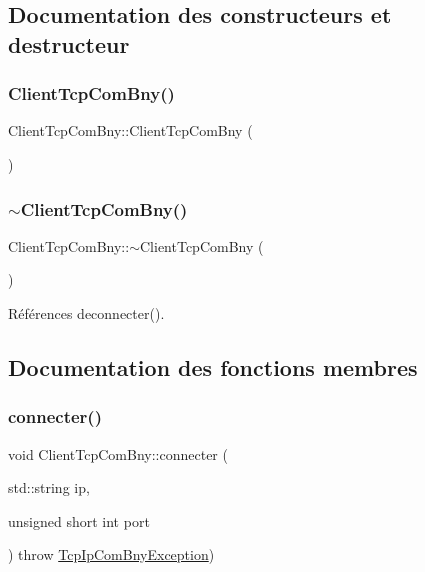 \subsection{Documentation des constructeurs et destructeur}
\mbox{\label{classClientTcpComBny_a4e87071b400a5129f642a5a3721d420f}} 
\subsubsection{\texorpdfstring{Client\+Tcp\+Com\+Bny()}{ClientTcpComBny()}}
{\footnotesize\ttfamily Client\+Tcp\+Com\+Bny\+::\+Client\+Tcp\+Com\+Bny (\begin{DoxyParamCaption}{ }\end{DoxyParamCaption})}

\mbox{\label{classClientTcpComBny_ade30f75875dc873e2dc522228a7e5c68}} 
\subsubsection{\texorpdfstring{$\sim$\+Client\+Tcp\+Com\+Bny()}{~ClientTcpComBny()}}
{\footnotesize\ttfamily Client\+Tcp\+Com\+Bny\+::$\sim$\+Client\+Tcp\+Com\+Bny (\begin{DoxyParamCaption}{ }\end{DoxyParamCaption})}



Références deconnecter().



\subsection{Documentation des fonctions membres}
\mbox{\label{classClientTcpComBny_ac105b046c2e544b1a433f99d83d7447a}} 
\subsubsection{\texorpdfstring{connecter()}{connecter()}}
{\footnotesize\ttfamily void Client\+Tcp\+Com\+Bny\+::connecter (\begin{DoxyParamCaption}\item[{std\+::string}]{ip,  }\item[{unsigned short int}]{port }\end{DoxyParamCaption}) throw  \hyperlink{classTcpIpComBnyException}{Tcp\+Ip\+Com\+Bny\+Exception}) }



